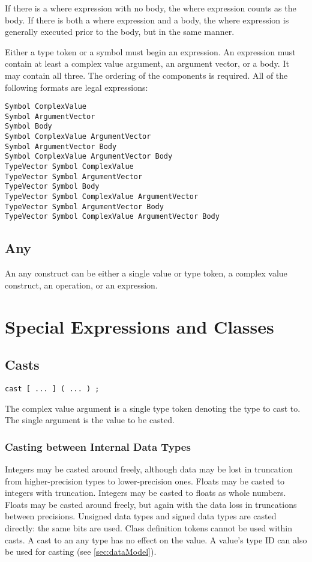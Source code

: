 \documentclass[10pt,a4paper]{article}
\begin{document}
If there is a where expression with no body, the where expression counts as the body. If there is both a where expression and a body, the where expression is generally executed prior to the body, but in the same manner. 

Either a type token or a symbol must begin an expression. An expression must contain at least a complex value argument, an argument vector, or a body. It may contain all three. The ordering of the components is required. All of the following formats are legal expressions:
\begin{verbatim}
Symbol ComplexValue
Symbol ArgumentVector
Symbol Body
Symbol ComplexValue ArgumentVector
Symbol ArgumentVector Body
Symbol ComplexValue ArgumentVector Body
TypeVector Symbol ComplexValue
TypeVector Symbol ArgumentVector
TypeVector Symbol Body
TypeVector Symbol ComplexValue ArgumentVector
TypeVector Symbol ArgumentVector Body
TypeVector Symbol ComplexValue ArgumentVector Body
\end{verbatim}

\subsection{Any}
An any construct can be either a single value or type token, a complex value construct, an operation, or an expression.

\section{Special Expressions and Classes}
\subsection{Casts}
\begin{verbatim}
cast [ ... ] ( ... ) ;
\end{verbatim}

The complex value argument is a single type token denoting the type to cast to. The single argument is the value to be casted.

\subsubsection{Casting between Internal Data Types}
Integers may be casted around freely, although data may be lost in truncation from higher-precision types to lower-precision ones. Floats may be casted to integers with truncation. Integers may be casted to floats as whole numbers. Floats may be casted around freely, but again with the data loss in truncations between precisions. Unsigned data types and signed data types are casted directly: the same bits are used. Class definition tokens cannot be used within casts. A cast to an any type has no effect on the value. A value's type ID can also be used for casting (see \ref{sec:dataModel}). 
\end{document}
